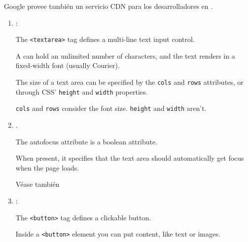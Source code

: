 Google provee también un servicio CDN para los desarrolladores en
.


\begin{enumerate}

\item {}:

The \verb|<textarea>| tag defines a multi-line text input control.

A  can hold an unlimited number of characters, and the text
renders in a fixed-width font (usually Courier).

The size of a text area can be specified by the \verb|cols| and \verb|rows| 
attributes, or through CSS' \verb|height| and \verb|width| properties.

\verb|cols| and \verb|rows| consider the font size. 
\verb|height| and \verb|width| aren't.

\item {}.

The autofocus attribute is a boolean attribute.

When present, it specifies that the text area should automatically get focus when the page loads.

Véase también \cite{pilgrimhtml5}

\item {}:

The \verb|<button>| tag defines a clickable button.

Inside a \verb|<button>| element you can put content, like text or images. 

\end{enumerate}



